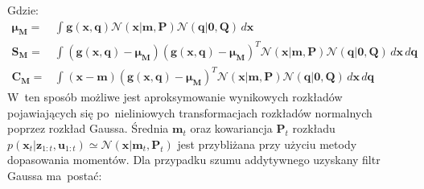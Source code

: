 Gdzie:
\begin{align}\label{eq:GaussianMomentMatchingNonAdditiveWhere}
\boldsymbol{\mu_M} =& \int_{}^{}\boldsymbol{g}(\boldsymbol{x}, \boldsymbol{q})\mathcal{N}(\boldsymbol{x}|\boldsymbol{m, \boldsymbol{P}}) \mathcal{N}(\boldsymbol{q}|\boldsymbol{0}, \boldsymbol{Q}) \,d\boldsymbol{x} \nonumber \\
\boldsymbol{S_M}=&\int_{}^{}(\boldsymbol{g}(\boldsymbol{x},\boldsymbol{q}) - \boldsymbol{\mu_M})(\boldsymbol{g}(\boldsymbol{x},\boldsymbol{q}) - \boldsymbol{\mu_M})^T \mathcal{N}(\boldsymbol{x}|\boldsymbol{m, \boldsymbol{P}}) \mathcal{N}(\boldsymbol{q}|\boldsymbol{0}, \boldsymbol{Q}) \,d\boldsymbol{x} \,d\boldsymbol{q} \nonumber \\
\boldsymbol{C_M}=&\int_{}^{}(\boldsymbol{x}-\boldsymbol{m})(\boldsymbol{g}(\boldsymbol{x},\boldsymbol{q}) - \boldsymbol{\mu_M})^T \mathcal{N}(\boldsymbol{x}|\boldsymbol{m, \boldsymbol{P}}) \mathcal{N}(\boldsymbol{q}|\boldsymbol{0}, \boldsymbol{Q}) \,d\boldsymbol{x} \,d\boldsymbol{q}
\end{align}
W~ten sposób możliwe jest aproksymowanie wynikowych rozkładów pojawiających się po~nieliniowych transformacjach rozkładów normalnych poprzez rozkład Gaussa. Średnia $\boldsymbol{m}_t$ oraz kowariancja $\boldsymbol{P}_t$ rozkładu $p(\boldsymbol{x}_t|\boldsymbol{z}_{1:t},\boldsymbol{u}_{1:t}) \simeq \mathcal{N}(\boldsymbol{x}|\boldsymbol{m}_t,\boldsymbol{P}_t)$ jest przybliżana przy użyciu metody dopasowania momentów. Dla przypadku szumu addytywnego uzyskany filtr Gaussa ma~postać:
